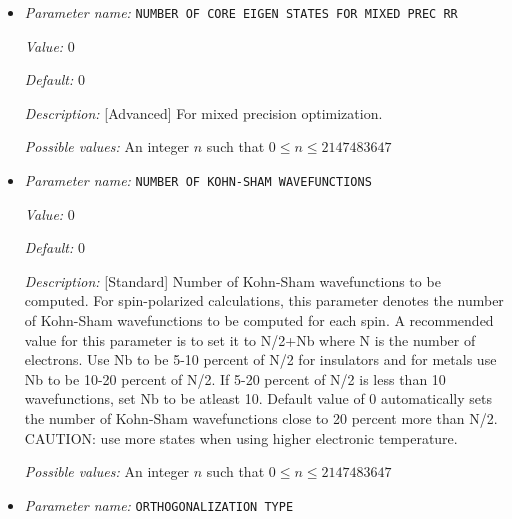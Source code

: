 \begin{itemize}
{\it Possible values:} An integer $n$ such that $0\leq n \leq 2147483647$
\item {\it Parameter name:} {\tt NUMBER OF CORE EIGEN STATES FOR MIXED PREC RR}
\label{parameters:SCF parameters/Eigen_2dsolver parameters/NUMBER OF CORE EIGEN STATES FOR MIXED PREC RR}
\label{parameters:SCF_20parameters/Eigen_2dsolver_20parameters/NUMBER_20OF_20CORE_20EIGEN_20STATES_20FOR_20MIXED_20PREC_20RR}


{\it Value:} 0


{\it Default:} 0


{\it Description:} [Advanced] For mixed precision optimization.


{\it Possible values:} An integer $n$ such that $0\leq n \leq 2147483647$
\item {\it Parameter name:} {\tt NUMBER OF KOHN-SHAM WAVEFUNCTIONS}
\label{parameters:SCF parameters/Eigen_2dsolver parameters/NUMBER OF KOHN_2dSHAM WAVEFUNCTIONS}
\label{parameters:SCF_20parameters/Eigen_2dsolver_20parameters/NUMBER_20OF_20KOHN_2dSHAM_20WAVEFUNCTIONS}


{\it Value:} 0


{\it Default:} 0


{\it Description:} [Standard] Number of Kohn-Sham wavefunctions to be computed. For spin-polarized calculations, this parameter denotes the number of Kohn-Sham wavefunctions to be computed for each spin. A recommended value for this parameter is to set it to N/2+Nb where N is the number of electrons. Use Nb to be 5-10 percent of N/2 for insulators and for metals use Nb to be 10-20 percent of N/2. If 5-20 percent of N/2 is less than 10 wavefunctions, set Nb to be atleast 10. Default value of 0 automatically sets the number of Kohn-Sham wavefunctions close to 20 percent more than N/2. CAUTION: use more states when using higher electronic temperature.


{\it Possible values:} An integer $n$ such that $0\leq n \leq 2147483647$
\item {\it Parameter name:} {\tt ORTHOGONALIZATION TYPE}
\label{parameters:SCF parameters/Eigen_2dsolver parameters/ORTHOGONALIZATION TYPE}
\label{parameters:SCF_20parameters/Eigen_2dsolver_20parameters/ORTHOGONALIZATION_20TYPE}



\end{itemize}
